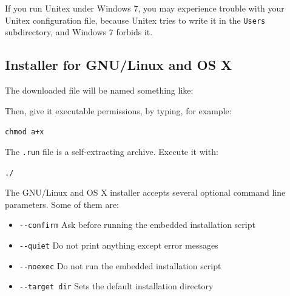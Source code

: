 \noindent If you run Unitex under Windows 7, you may experience trouble with your Unitex configuration
file, because Unitex tries to write it in the \verb+Users+ subdirectory, and Windows 7 forbids it.

\subsection{Installer for GNU/Linux and OS X}
The downloaded file will be named something like:

\begin{flushleft}
{\tt \UnitexPackageLinux{}}
{\tt \UnitexPackageLinuxSF{}}
\end{flushleft}

\noindent Then, give it executable permissions, by typing, for example:

\begin{flushleft}
{\tt chmod a+x \UnitexPackageLinux{}}
\end{flushleft}

\noindent The \verb+.run+ file is a self-extracting archive. Execute it with:

\begin{flushleft}
{\tt ./\UnitexPackageLinux{}}
\end{flushleft}

\begin{samepage}
\noindent The GNU/Linux and OS X installer accepts several optional command line parameters. Some of them are:

\begin{itemize}
\itemsep1pt\parskip0pt
\item
  \texttt{-\/-confirm} \hspace{.15in} Ask before running the embedded installation
  script\\
\item
  \texttt{-\/-quiet} \hspace{.15in} Do not print anything except error messages\\
\item
  \texttt{-\/-noexec} \hspace{.15in} Do not run the embedded installation script\\
\item
  \texttt{-\/-target dir}  \hspace{.15in} Sets the default installation directory
\end{itemize}
\end{samepage}


